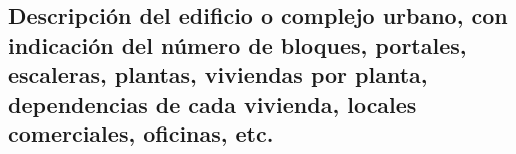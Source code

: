 \subsection{Descripción del edificio o complejo urbano, con indicación del número de bloques, portales, escaleras, plantas, viviendas por planta, dependencias de cada vivienda, locales comerciales, oficinas, etc.}
